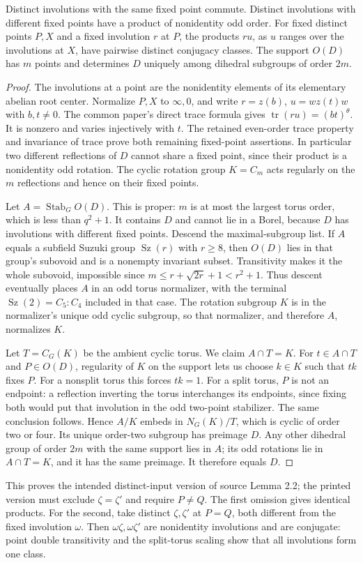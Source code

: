 \documentclass[11pt,a4paper]{article}
\newcommand{\Sz}{\operatorname{Sz}}\newcommand{\Aut}{\operatorname{Aut}}
\begin{document}
\begin{lemma}\label{support}
Distinct involutions with the same fixed point commute. Distinct involutions
with different fixed points have a product of nonidentity odd order.
For fixed distinct points $P,X$ and a fixed involution $r$ at $P$, the
products $ru$, as $u$ ranges over the involutions at $X$, have pairwise
distinct conjugacy classes. The support $O(D)$ has $m$ points and determines
$D$ uniquely among dihedral subgroups of order $2m$.
\end{lemma}
\begin{proof}
The involutions at a point are the nonidentity elements of its elementary
abelian root center. Normalize $P,X$ to $\infty,0$, and write
$r=z(b)$, $u=wz(t)w$ with $b,t\ne0$. The common paper's direct trace formula
gives $\operatorname{tr}(ru)=(bt)^\theta$. It is nonzero and varies
injectively with $t$. The retained even-order trace property and invariance
of trace prove both remaining fixed-point assertions. In particular two
different reflections of $D$ cannot share a fixed point, since their
product is a nonidentity odd rotation. The cyclic rotation group $K=C_m$
acts regularly on the $m$ reflections and hence on their fixed points.

Let $A=\operatorname{Stab}_G O(D)$. This is proper: $m$ is at most the largest
torus order, which is less than $q^2+1$. It contains $D$ and cannot lie in a
Borel, because $D$ has involutions with different fixed points. Descend the
maximal-subgroup list. If $A$ equals a subfield Suzuki group $\Sz(r)$ with
$r\ge8$, then $O(D)$ lies in that group's subovoid and is a nonempty invariant
subset. Transitivity makes it the whole subovoid, impossible since
$m\le r+\sqrt{2r}+1<r^2+1$. Thus descent eventually places $A$ in an odd
torus normalizer, with the terminal $\Sz(2)=C_5:C_4$ included in that case.
The rotation subgroup $K$ is in the normalizer's unique odd cyclic subgroup,
so that normalizer, and therefore $A$, normalizes $K$.

Let $T=C_G(K)$ be the ambient cyclic torus. We claim $A\cap T=K$.
For $t\in A\cap T$ and $P\in O(D)$, regularity of $K$ on the support lets
us choose $k\in K$ such that $tk$ fixes $P$. For a nonsplit torus this forces
$tk=1$. For a split torus, $P$ is not an endpoint: a reflection inverting
the torus interchanges its endpoints, since fixing both would put that
involution in the odd two-point stabilizer. The same conclusion follows.
Hence $A/K$ embeds in $N_G(K)/T$, which is cyclic of order two or four.
Its unique order-two subgroup has preimage $D$. Any other dihedral group
of order $2m$ with the same support lies in $A$; its odd rotations lie in
$A\cap T=K$, and it has the same preimage. It therefore equals $D$.
\end{proof}
This proves the intended distinct-input version of source Lemma 2.2; the
printed version must exclude $\zeta=\zeta'$ and require $P\ne Q$.
The first omission gives identical products. For the second, take distinct
$\zeta,\zeta'$ at $P=Q$, both different from the fixed involution $\omega$.
Then $\omega\zeta,\omega\zeta'$ are nonidentity involutions and are
conjugate: point double transitivity and the split-torus scaling show
that all involutions form one class.
\end{document}
